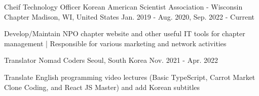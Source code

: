 

\begin{cventries}

  \cventry
  {Cheif Technology Officer} %
  {Korean American Scientist Association - Wisconsin Chapter} %
  {Madison, WI, United States} %
  {Jan. 2019 - Aug. 2020, Sep. 2022 - Current} %
  {
    \begin{cvitems} %
      \item {Develop/Maintain NPO chapter website and other useful IT tools for chapter management | Responsible for various marketing and network activities}
    \end{cvitems}
  }

  \cventry
  {Translator} %
  {Nomad Coders} %
  {Seoul, South Korea} %
  {Nov. 2021 - Apr. 2022} %
  {
    \begin{cvitems} %
      \item {Translate English programming video lectures (Basic TypeScript, Carrot Market Clone Coding, and React JS Master) and add Korean subtitles}
    \end{cvitems}
  }

\end{cventries}
